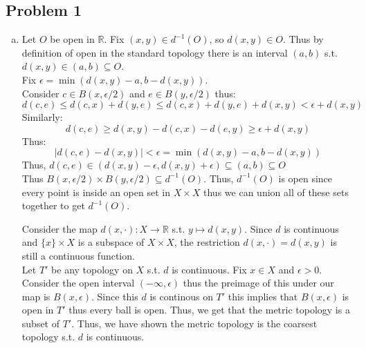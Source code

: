 \documentclass[12pt, letterpaper]{article}
\theoremstyle{definition}
\newcommand{\R}{\mathbb{R}}
\begin{document}
\pagestyle{fancy}
\fancyhf{}
\fancyhead[ROE]{\thepage}

\subsection*{Problem 1}
\begin{enumerate}[(a)]
    \item Let $O$ be open in $\R$.
    Fix $(x,y) \in d^{-1}(O)$, so $d(x,y) \in O$. Thus by definition of open in the standard topology there is an interval $(a,b)$ s.t. $d(x,y) \in (a,b) \subseteq O$.\\ 
    Fix $\epsilon = \min(d(x,y)-a,b-d(x,y))$.\\
    Consider $c \in B(x,\epsilon/2)$ and $e \in B(y, \epsilon/2)$ thus:
    \[d(c,e) \leq d(c,x)+d(y,e) \leq d(c,x)+d(y,e)+d(x,y) < \epsilon + d(x,y)\]
    Similarly:
    \[d(c,e) \geq d(x,y)-d(c,x)-d(e,y) \geq \epsilon + d(x,y)\]
    Thus:
    \[|d(c,e)-d(x,y)| < \epsilon=\min(d(x,y)-a,b-d(x,y))\]
    Thus, $d(c,e) \in (d(x,y)-\epsilon, d(x,y)+\epsilon) \subseteq (a,b) \subseteq O$\\
    Thus $B(x,\epsilon/2) \times B(y,\epsilon/2) \subseteq d^{-1}(O)$. Thus, $d^{-1}(O)$ is open since every point is inside an open set in $X \times X$ thus we can union all of these sets together to get $d^{-1}(O)$.

    Consider the map $d(x, \cdot) : X \to \R$ s.t. $y \mapsto d(x,y)$. Since $d$ is continuous and $\{x\} \times X$ is a subspace of $X \times X$, the restriction $d(x,\cdot)=d(x,y)$ is still a continuous function.\\
    Let $T'$ be any topology on $X$ s.t. $d$ is continuous. Fix $x \in X$ and $\epsilon > 0$. Consider the open interval $(-\infty,\epsilon)$ thus the preimage of this under our map is $B(x,\epsilon)$. Since this $d$ is continous on $T'$ this implies that $B(x,\epsilon)$ is open in $T'$ thus every ball is open. Thus, we get that the metric topology is a subset of $T'$. Thus, we have shown the metric topology is the coarsest topology s.t. $d$ is continuous.
\end{enumerate}

\newpage
\end{document}
